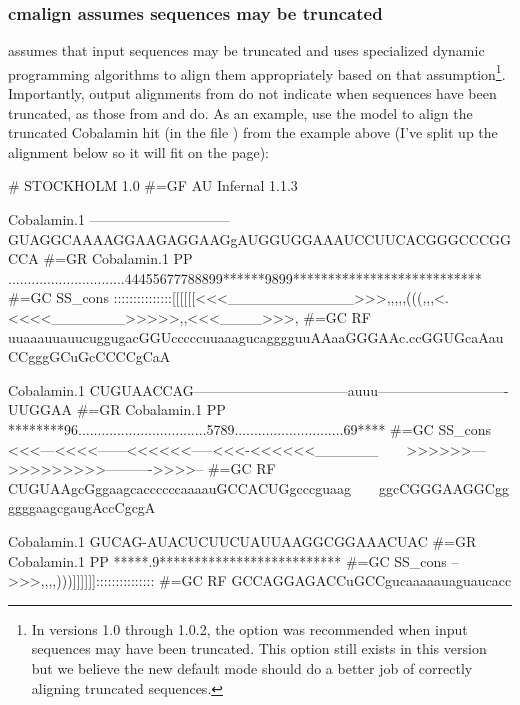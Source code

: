 \subsubsection{cmalign assumes sequences may be truncated}
 assumes that input sequences may be truncated and uses
specialized dynamic programming algorithms to align them appropriately
based on that assumption\footnote{In versions 1.0 through 1.0.2, the
    option was recommended when input
  sequences may have been truncated. This option still exists in this
  version but we believe the new default mode should do a better job
  of correctly aligning truncated sequences.}. Importantly, output
alignments from  do not indicate when sequences have
been truncated, as those from  and  do. As
an example, use the  model to align the
truncated Cobalamin hit (in the file )
from the  example above (I've split up the alignment
below so it will fit on the page):


\label{cmalign-cobalamin}
\begin{sreoutput}
# STOCKHOLM 1.0
#=GF AU Infernal 1.1.3

Cobalamin.1         ------------------------------GUAGGCAAAAGGAAGAGGAAGgAUGGUGGAAAUCCUUCACGGGCCCGGCCA
#=GR Cobalamin.1 PP ..............................44455677788899******9899***************************
#=GC SS_cons        :::::::::::::::[[[[[[<<<____________>>>,,,,,(((,,,<.<<<<_______>>>>>,,<<<____>>>,
#=GC RF             uuaaauuauucuggugacGGUcccccuuaaagucagggguuAAaaGGGAAc.ccGGUGcaAauCCgggGCuGcCCCCgCaA


Cobalamin.1         CUGUAACCAG---------------------------------auuu----------------------------UUGGAA
#=GR Cobalamin.1 PP ********96.................................5789............................69****
#=GC SS_cons        <<<---<<<<------<<<<<<-----<<<-<<<<<<______~~~~>>>>>>--->>>>>>>>>---------->>>>--
#=GC RF             CUGUAAgcGggaagcaccccccaaaauGCCACUGgcccguaag~~~~ggcCGGGAAGGCggggggaagcgaugAccCgcgA


Cobalamin.1         GUCAG-AUACUCUUCUAUUAAGGCGGAAACUAC
#=GR Cobalamin.1 PP *****.9**************************
#=GC SS_cons        -->>>,,,,)))]]]]]]:::::::::::::::
#=GC RF             GCCAGGAGACCuGCCgucaaaaauaguaucacc

\end{sreoutput}

